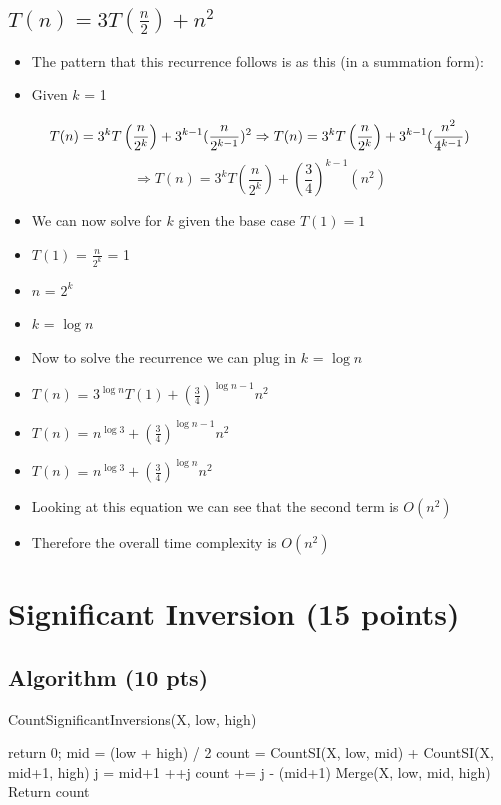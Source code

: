 \documentclass{article}[12pt]
\begin{document}
\vspace*{10px}
\subsection{$T(n) = 3T\left(\frac{n}{2}\right) + n^2$}
\begin{itemize}
  \item The pattern that this recurrence follows is as this (in a summation form):
  \item Given $k$ = 1
\end{itemize}

\begin{equation*}
  T(n) = 3^{k} T\left(\frac{n}{2^{k}}\right) + 3^{k-1} (\frac{n}{2^{k-1}})^{2}
  \Rightarrow
  T(n) = 3^{k} T\left(\frac{n}{2^{k}}\right) + 3^{k-1} (\frac{n^{2}}{4^{k-1}}) \\
\end{equation*}
\begin{equation*}
  \Rightarrow
  T(n) = 3^{k} T\left(\frac{n}{2^{k}}\right) + (\frac{3}{4})^{k-1} (n^{2})
\end{equation*}

\begin{itemize}
  \item We can now solve for $k$ given the base case $T(1) = 1$
  \item $T(1)$ = $\frac{n}{2^{k}}$ = 1
  \item $n$ = $2^{k}$
  \item $k$ = $\log n$
  \item Now to solve the recurrence we can plug in $k$ = $\log n$
  \item $T(n)$ = $3^{\log n} T(1) + (\frac{3}{4})^{\log n - 1} n^{2}$
  \item $T(n)$ = $n^{\log 3} + (\frac{3}{4})^{\log n - 1} n^{2}$
  \item $T(n)$ = $n^{\log 3} + (\frac{3}{4})^{\log n} n^{2}$
  \item Looking at this equation we can see that the second term is $O(n^{2})$
  \item Therefore the overall time complexity is $O(n^{2})$
\end{itemize}

\newpage

\section{Significant Inversion (15 points)}

\subsection{Algorithm (10 pts)}
\begin{algorithm}[H]
\caption{CountSignificantInversions(X, low, high)}
 {return 0;}
mid = (low + high) / 2\;
count = CountSI(X, low, mid) + CountSI(X, mid+1, high)\;
j = mid+1\;
 {
   {
    ++j\;
  }
  count += j - (mid+1)\;
}
Merge(X, low, mid, high)\;
Return count\;

\end{algorithm}
\end{document}
